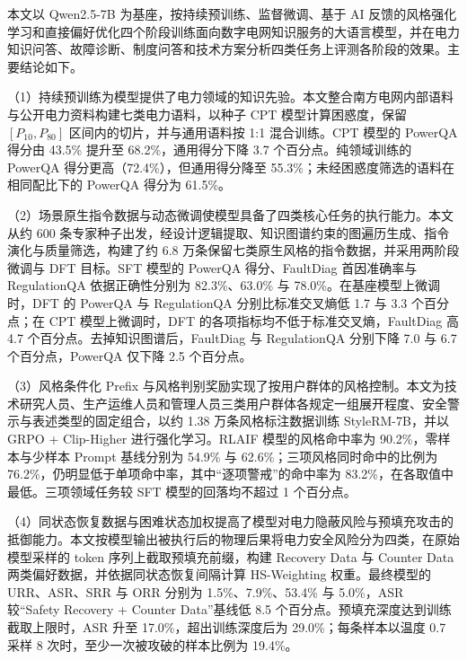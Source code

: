 \documentclass[fontset=fandol,type=master,campus=shenzhen,etitleauto=true]{hithesisbook}
\begin{document}
\backmatter
\begin{conclusions}
\label{ux603bux7ed3ux4e0eux5c55ux671b}

本文以 Qwen2.5-7B 为基座，按持续预训练、监督微调、基于 AI 反馈的风格强化学习和直接偏好优化四个阶段训练面向数字电网知识服务的大语言模型，并在电力知识问答、故障诊断、制度问答和技术方案分析四类任务上评测各阶段的效果。主要结论如下。

（1）持续预训练为模型提供了电力领域的知识先验。本文整合南方电网内部语料与公开电力资料构建七类电力语料，以种子 CPT 模型计算困惑度，保留 $[P_{10}, P_{80}]$ 区间内的切片，并与通用语料按 1:1 混合训练。CPT 模型的 PowerQA 得分由 43.5\% 提升至 68.2\%，通用得分下降 3.7 个百分点。纯领域训练的 PowerQA 得分更高（72.4\%），但通用得分降至 55.3\%；未经困惑度筛选的语料在相同配比下的 PowerQA 得分为 61.5\%。

（2）场景原生指令数据与动态微调使模型具备了四类核心任务的执行能力。本文从约 600 条专家种子出发，经设计逻辑提取、知识图谱约束的图遍历生成、指令演化与质量筛选，构建了约 6.8 万条保留七类原生风格的指令数据，并采用两阶段微调与 DFT 目标。SFT 模型的 PowerQA 得分、FaultDiag 首因准确率与 RegulationQA 依据正确性分别为 82.3\%、63.0\% 与 78.0\%。在基座模型上微调时，DFT 的 PowerQA 与 RegulationQA 分别比标准交叉熵低 1.7 与 3.3 个百分点；在 CPT 模型上微调时，DFT 的各项指标均不低于标准交叉熵，FaultDiag 高 4.7 个百分点。去掉知识图谱后，FaultDiag 与 RegulationQA 分别下降 7.0 与 6.7 个百分点，PowerQA 仅下降 2.5 个百分点。

（3）风格条件化 Prefix 与风格判别奖励实现了按用户群体的风格控制。本文为技术研究人员、生产运维人员和管理人员三类用户群体各规定一组展开程度、安全警示与表述类型的固定组合，以约 1.38 万条风格标注数据训练 StyleRM-7B，并以 GRPO + Clip-Higher 进行强化学习。RLAIF 模型的风格命中率为 90.2\%，零样本与少样本 Prompt 基线分别为 54.9\% 与 62.6\%；三项风格同时命中的比例为 76.2\%，仍明显低于单项命中率，其中“逐项警戒”的命中率为 83.2\%，在各取值中最低。三项领域任务较 SFT 模型的回落均不超过 1 个百分点。

（4）同状态恢复数据与困难状态加权提高了模型对电力隐蔽风险与预填充攻击的抵御能力。本文按模型输出被执行后的物理后果将电力安全风险分为四类，在原始模型采样的 token 序列上截取预填充前缀，构建 Recovery Data 与 Counter Data 两类偏好数据，并依据同状态恢复间隔计算 HS-Weighting 权重。最终模型的 URR、ASR、SRR 与 ORR 分别为 1.5\%、7.9\%、53.4\% 与 5.0\%，ASR 较“Safety Recovery + Counter Data”基线低 8.5 个百分点。预填充深度达到训练截取上限时，ASR 升至 17.0\%，超出训练深度后为 29.0\%；每条样本以温度 0.7 采样 8 次时，至少一次被攻破的样本比例为 19.4\%。


\end{conclusions}
\end{document}

